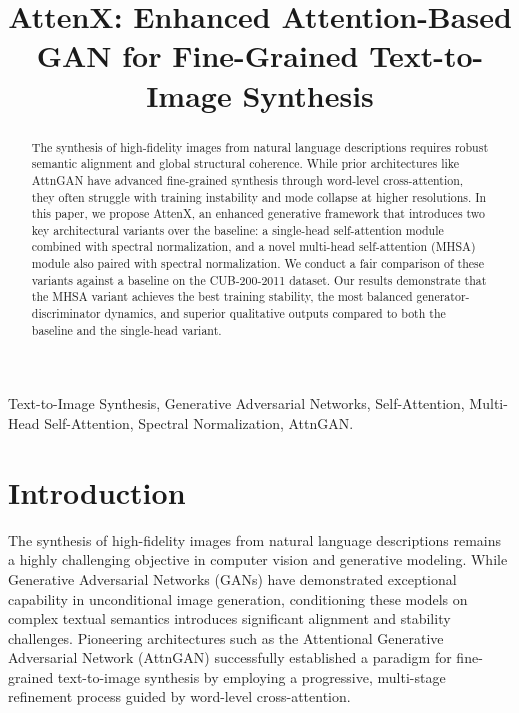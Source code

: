 \documentclass[conference]{IEEEtran}
\begin{document}
\title{AttenX: Enhanced Attention-Based GAN for Fine-Grained Text-to-Image Synthesis}

\author{
}

\maketitle

\begin{abstract}
The synthesis of high-fidelity images from natural language descriptions requires robust semantic alignment and global structural coherence. While prior architectures like AttnGAN have advanced fine-grained synthesis through word-level cross-attention, they often struggle with training instability and mode collapse at higher resolutions. In this paper, we propose AttenX, an enhanced generative framework that introduces two key architectural variants over the baseline: a single-head self-attention module combined with spectral normalization, and a novel multi-head self-attention (MHSA) module also paired with spectral normalization. We conduct a fair comparison of these variants against a baseline on the CUB-200-2011 dataset. Our results demonstrate that the MHSA variant achieves the best training stability, the most balanced generator-discriminator dynamics, and superior qualitative outputs compared to both the baseline and the single-head variant.
\end{abstract}

\begin{IEEEkeywords}
Text-to-Image Synthesis, Generative Adversarial Networks, Self-Attention, Multi-Head Self-Attention, Spectral Normalization, AttnGAN.
\end{IEEEkeywords}

\section{Introduction}

The synthesis of high-fidelity images from natural language descriptions remains a highly challenging objective in computer vision and generative modeling. While Generative Adversarial Networks (GANs) \cite{goodfellow2014generative} have demonstrated exceptional capability in unconditional image generation, conditioning these models on complex textual semantics introduces significant alignment and stability challenges. Pioneering architectures such as the Attentional Generative Adversarial Network (AttnGAN) \cite{xu2018attngan} successfully established a paradigm for fine-grained text-to-image synthesis by employing a progressive, multi-stage refinement process guided by word-level cross-attention.
\end{document}
